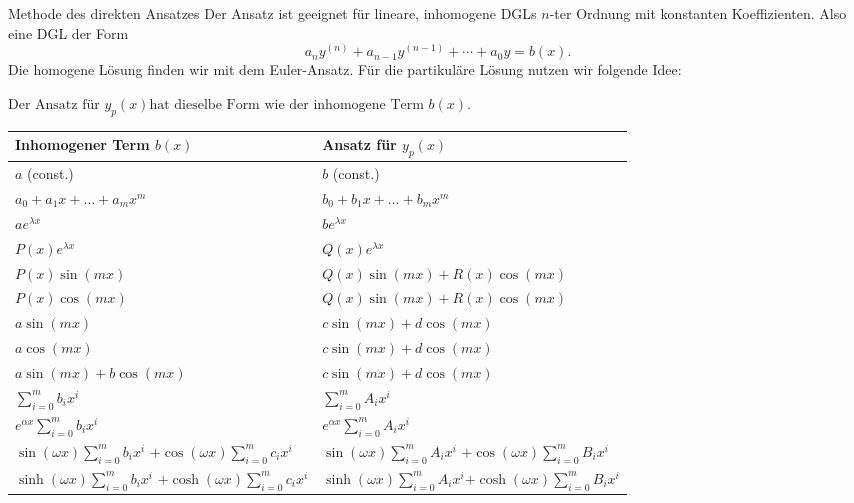 \begin{Rezept}{Methode des direkten Ansatzes}{}
	Der Ansatz ist geeignet für lineare, inhomogene DGLs $n$-ter Ordnung mit konstanten Koeffizienten. Also eine DGL der Form
	\begin{equation*}
	a_n y^{(n)} + a_{n-1} y^{(n-1)}+\cdots+a_0y = b(x).
	\end{equation*}
	Die homogene Lösung finden wir mit dem Euler-Ansatz. Für die partikuläre Lösung nutzen wir folgende Idee:
	\begin{center}
		$\boxed{\text{Der Ansatz für } y_p(x) \text{hat dieselbe Form wie der inhomogene Term } b(x).}$
	\end{center}
	\renewcommand{\arraystretch}{1.2}
	\begin{center}
		\begin{tabularx}{\textwidth}{X|X}
			\hline 
			\textbf{Inhomogener Term $b(x)$} & \textbf{Ansatz für $y_p(x)$} \\ 
			\hline
			$a$ (const.) & $b$ (const.)\\
			$a_0 + a_1 x + \ldots + a_m x^m$ & $b_0 + b_1 x + \ldots + b_m x^m$\\
			$a e^{\lambda x}$ & $b e^{\lambda x}$\\
			$P(x) e^{\lambda x}$ & $Q(x) e^{\lambda x}$\\
			$P(x) \sin(mx)$ & $Q(x) \sin(mx) + R(x) \cos(mx)$\\
			$P(x) \cos(mx)$ & $Q(x) \sin(mx) + R(x) \cos(mx)$\\
			$a \sin(mx)$ & $c \sin(mx) + d \cos(mx)$\\
			$a \cos(mx)$ & $c \sin(mx) + d \cos(mx)$\\
			$a \sin(mx) + b \cos(mx)$ & $c \sin(mx) + d \cos(mx)$\\
			$\sum_{i=0}^m b_i x^i$ &	$\sum_{i=0}^m A_i x^i$ \\
			$e^{\alpha x}\sum_{i=0}^m b_i x^i$& $e^{\alpha x} \sum_{i=0}^m A_i x^i$ \\ \hline
			$\sin(\omega x)\sum_{i=0}^m b_i x^i$ \newline
			$+ \cos(\omega x)\sum_{i=0}^m c_i x^i$ & $\sin(\omega x)\sum_{i=0}^m A_i x^i$ \newline $+\cos(\omega x)\sum_{i=0}^m B_i x^i$\\ \hline
			$\sinh(\omega x)\sum_{i=0}^m b_i x^i$ \newline $+\cosh(\omega x)\sum_{i=0}^m c_i x^i$ &  	$\sinh(\omega x)\sum_{i=0}^m A_i x^i $\newline$+ \cosh(\omega x)\sum_{i=0}^m B_i x^i$ \\ \hline

\end{tabularx}
\end{center}
\end{Rezept}
